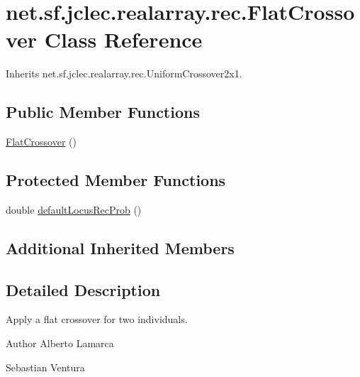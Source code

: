 \hypertarget{classnet_1_1sf_1_1jclec_1_1realarray_1_1rec_1_1_flat_crossover}{\section{net.\-sf.\-jclec.\-realarray.\-rec.\-Flat\-Crossover Class Reference}
\label{classnet_1_1sf_1_1jclec_1_1realarray_1_1rec_1_1_flat_crossover}
}


Inherits net.\-sf.\-jclec.\-realarray.\-rec.\-Uniform\-Crossover2x1.

\subsection*{Public Member Functions}
\begin{DoxyCompactItemize}
\item 
\hyperlink{classnet_1_1sf_1_1jclec_1_1realarray_1_1rec_1_1_flat_crossover_a7b870a24cbcdc0dad5a66e809ac57d94}{Flat\-Crossover} ()
\end{DoxyCompactItemize}
\subsection*{Protected Member Functions}
\begin{DoxyCompactItemize}
\item 
double \hyperlink{classnet_1_1sf_1_1jclec_1_1realarray_1_1rec_1_1_flat_crossover_a1c517b81d958cba11ea7cee6167c2616}{default\-Locus\-Rec\-Prob} ()
\end{DoxyCompactItemize}
\subsection*{Additional Inherited Members}


\subsection{Detailed Description}
Apply a flat crossover for two individuals.

\begin{DoxyAuthor}{Author}
Alberto Lamarca 

Sebastian Ventura 
\end{DoxyAuthor}


